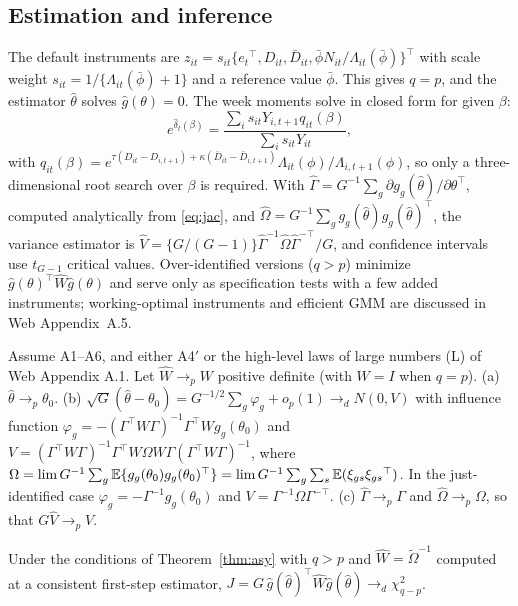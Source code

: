 \subsection{Estimation and inference}
\label{ss:estimation}

The default instruments are
$z_{it}=s_{it}\{e_t{}^{\top},D_{it},\bar D_{it},\bar\phi N_{it}/\Lambda_{it}(\bar\phi)\}^{\top}$
with scale weight $s_{it}=1/\{\Lambda_{it}(\bar\phi)+1\}$ and a reference value $\bar\phi$. This
gives $q=p$, and the estimator $\hat\theta$ solves $\hat g(\theta)=0$. The week moments solve in
closed form for given $\beta$:
\begin{equation}
e^{\hat\delta_t(\beta)}=\frac{\sum_i s_{it}Y_{i,t+1}q_{it}(\beta)}{\sum_i s_{it}Y_{it}},
\label{eq:profile}
\end{equation}
with $q_{it}(\beta)=e^{\tau(D_{it}-D_{i,t+1})+\kappa(\bar D_{it}-\bar D_{i,t+1})}\Lambda_{it}(\phi)/\Lambda_{i,t+1}(\phi)$,
so only a three-dimensional root search over $\beta$ is required. With
$\hat\Gamma=G^{-1}\sum_g\partial g_g(\hat\theta)/\partial\theta^{\top}$, computed analytically from
\eqref{eq:jac}, and $\hat\Omega=G^{-1}\sum_g g_g(\hat\theta)g_g(\hat\theta)^{\top}$, the variance
estimator is $\hat V=\{G/(G-1)\}\hat\Gamma^{-1}\hat\Omega\hat\Gamma^{-\top}/G$, and confidence
intervals use $t_{G-1}$ critical values. Over-identified versions ($q>p$) minimize
$\hat g(\theta)^{\top}\hat W\hat g(\theta)$ and serve only as specification tests with a few added
instruments; working-optimal instruments and efficient GMM are discussed in Web Appendix~A.5.

\begin{theorem}
\label{thm:asy}
Assume A1--A6, and either A4$'$ or the high-level laws of large numbers (L) of Web Appendix A.1.
Let $\hat W\to_p W$ positive definite (with $W=I$ when $q=p$).
(a) $\hat\theta\to_p\theta_0$.
(b) $\sqrt G(\hat\theta-\theta_0)=G^{-1/2}\sum_g\varphi_g+o_p(1)\to_d N(0,V)$ with influence function
$\varphi_g=-(\Gamma^{\top}W\Gamma)^{-1}\Gamma^{\top}Wg_g(\theta_0)$ and
$V=(\Gamma^{\top}W\Gamma)^{-1}\Gamma^{\top}W\Omega W\Gamma(\Gamma^{\top}W\Gamma)^{-1}$, where
$\Omega=\lim G^{-1}\sum_g\mathbb{E}\{g_g(\theta_0)g_g(\theta_0)^{\top}\}=\lim G^{-1}\sum_g\sum_s\mathbb{E}(\xi_{gs}\xi_{gs}{}^{\top})$.
In the just-identified case $\varphi_g=-\Gamma^{-1}g_g(\theta_0)$ and $V=\Gamma^{-1}\Omega\Gamma^{-\top}$.
(c) $\hat\Gamma\to_p\Gamma$ and $\hat\Omega\to_p\Omega$, so that $G\hat V\to_p V$.
\end{theorem}

\begin{corollary}
\label{cor:J}
Under the conditions of Theorem~\ref{thm:asy} with $q>p$ and $\hat W=\tilde\Omega^{-1}$ computed
at a consistent first-step estimator, $J=G\,\hat g(\hat\theta)^{\top}\hat W\hat g(\hat\theta)\to_d\chi^2_{q-p}$.
\end{corollary}

